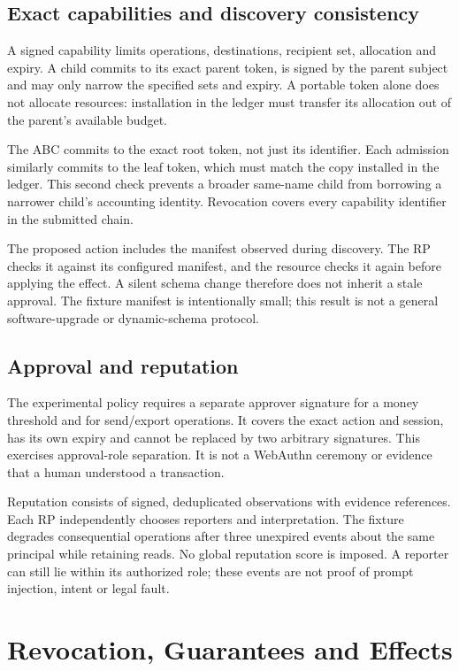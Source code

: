\documentclass[journal,10pt]{IEEEtran}
\begin{document}
\subsection{Exact capabilities and discovery consistency}
A signed capability limits operations, destinations, recipient set, allocation and expiry. A child commits to its exact parent token, is signed by the parent subject and may only narrow the specified sets and expiry. A portable token alone does not allocate resources: installation in the ledger must transfer its allocation out of the parent's available budget.

The ABC commits to the exact root token, not just its identifier. Each admission similarly commits to the leaf token, which must match the copy installed in the ledger. This second check prevents a broader same-name child from borrowing a narrower child's accounting identity. Revocation covers every capability identifier in the submitted chain.

The proposed action includes the manifest observed during discovery. The RP checks it against its configured manifest, and the resource checks it again before applying the effect. A silent schema change therefore does not inherit a stale approval. The fixture manifest is intentionally small; this result is not a general software-upgrade or dynamic-schema protocol.

\subsection{Approval and reputation}
The experimental policy requires a separate approver signature for a money threshold and for send/export operations. It covers the exact action and session, has its own expiry and cannot be replaced by two arbitrary signatures. This exercises approval-role separation. It is not a WebAuthn ceremony or evidence that a human understood a transaction.

Reputation consists of signed, deduplicated observations with evidence references. Each RP independently chooses reporters and interpretation. The fixture degrades consequential operations after three unexpired events about the same principal while retaining reads. No global reputation score is imposed. A reporter can still lie within its authorized role; these events are not proof of prompt injection, intent or legal fault.

\section{Revocation, Guarantees and Effects}
\end{document}
